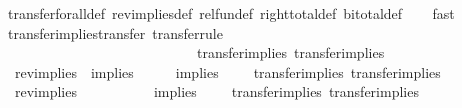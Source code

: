 \begin{isabellebody}
\ transfer{\isacharunderscore}{\kern0pt}forall{\isacharunderscore}{\kern0pt}def\ rev{\isacharunderscore}{\kern0pt}implies{\isacharunderscore}{\kern0pt}def\ rel{\isacharunderscore}{\kern0pt}fun{\isacharunderscore}{\kern0pt}def\ right{\isacharunderscore}{\kern0pt}total{\isacharunderscore}{\kern0pt}def\ bi{\isacharunderscore}{\kern0pt}total{\isacharunderscore}{\kern0pt}def\isanewline
\ \ \isamarkupfalse%
\ fast{\isacharplus}{\kern0pt}%
\endisatagproof
{\isafoldproof}%
%
\isadelimproof
\isanewline
%
\endisadelimproof
\isanewline
{}\isamarkupfalse%
\ transfer{\isacharunderscore}{\kern0pt}implies{\isacharunderscore}{\kern0pt}transfer\ {\isacharbrackleft}{\kern0pt}transfer{\isacharunderscore}{\kern0pt}rule{\isacharbrackright}{\kern0pt}{\isacharcolon}{\kern0pt}\isanewline
\ \ {\isachardoublequoteopen}{\isacharparenleft}{\kern0pt}{\isacharparenleft}{\kern0pt}{\isacharequal}{\kern0pt}{\isacharparenright}{\kern0pt}\ \ \ \ \ \ \ \ {\isacharequal}{\kern0pt}{\isacharequal}{\kern0pt}{\isacharequal}{\kern0pt}{\isachargreater}{\kern0pt}\ {\isacharparenleft}{\kern0pt}{\isacharequal}{\kern0pt}{\isacharparenright}{\kern0pt}\ \ \ \ \ \ \ \ {\isacharequal}{\kern0pt}{\isacharequal}{\kern0pt}{\isacharequal}{\kern0pt}{\isachargreater}{\kern0pt}\ {\isacharparenleft}{\kern0pt}{\isacharequal}{\kern0pt}{\isacharparenright}{\kern0pt}\ \ \ \ \ \ \ {\isacharparenright}{\kern0pt}\ transfer{\isacharunderscore}{\kern0pt}implies\ transfer{\isacharunderscore}{\kern0pt}implies{\isachardoublequoteclose}\isanewline
\ \ {\isachardoublequoteopen}{\isacharparenleft}{\kern0pt}rev{\isacharunderscore}{\kern0pt}implies\ {\isacharequal}{\kern0pt}{\isacharequal}{\kern0pt}{\isacharequal}{\kern0pt}{\isachargreater}{\kern0pt}\ implies\ \ \ \ \ {\isacharequal}{\kern0pt}{\isacharequal}{\kern0pt}{\isacharequal}{\kern0pt}{\isachargreater}{\kern0pt}\ implies\ \ \ \ {\isacharparenright}{\kern0pt}\ transfer{\isacharunderscore}{\kern0pt}implies\ transfer{\isacharunderscore}{\kern0pt}implies{\isachardoublequoteclose}\isanewline
\ \ {\isachardoublequoteopen}{\isacharparenleft}{\kern0pt}rev{\isacharunderscore}{\kern0pt}implies\ {\isacharequal}{\kern0pt}{\isacharequal}{\kern0pt}{\isacharequal}{\kern0pt}{\isachargreater}{\kern0pt}\ {\isacharparenleft}{\kern0pt}{\isacharequal}{\kern0pt}{\isacharparenright}{\kern0pt}\ \ \ \ \ \ \ \ {\isacharequal}{\kern0pt}{\isacharequal}{\kern0pt}{\isacharequal}{\kern0pt}{\isachargreater}{\kern0pt}\ implies\ \ \ \ {\isacharparenright}{\kern0pt}\ transfer{\isacharunderscore}{\kern0pt}implies\ transfer{\isacharunderscore}{\kern0pt}implies{\isachardoublequoteclose}\isanewline

\end{isabellebody}
